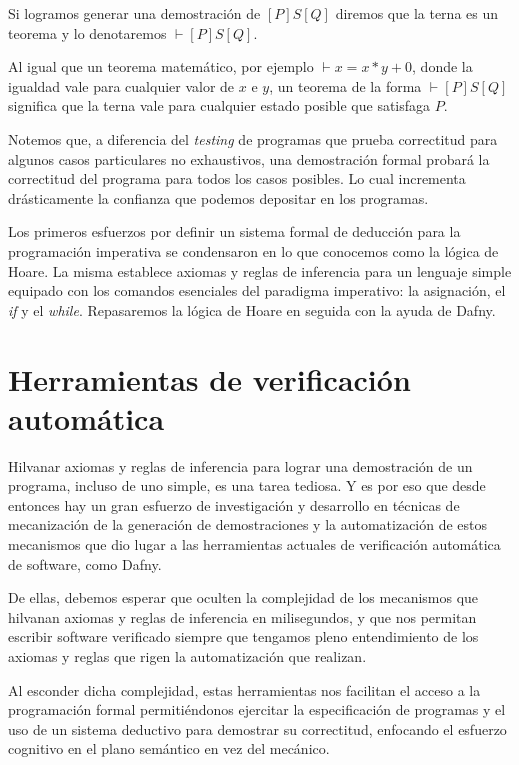 \documentclass[12pt, a4paper, openany, fleqn]{book}
\newcommand{\hoare}[3]{\ensuremath{[#1]#2[#3]}}
\newcommand{\hoareTheorem}[3]{\ensuremath{\vdash[#1]#2[#3]}}
\begin{document}
    Si logramos generar una demostración de \hoare{P}{S}{Q} diremos que la terna es un teorema y lo denotaremos \hoareTheorem{P}{S}{Q}.

    Al igual que un teorema matemático, por ejemplo $\vdash x = x * y + 0$, donde la igualdad vale para cualquier valor de $x$ e $y$, un teorema de la forma \hoareTheorem{P}{S}{Q} significa que la terna vale para cualquier estado posible que satisfaga $P$.

    Notemos que, a diferencia del \textit{testing} de programas que prueba correctitud para algunos casos particulares no exhaustivos, una demostración formal probará la correctitud del programa para todos los casos posibles. Lo cual incrementa drásticamente la confianza que podemos depositar en los programas.

    Los primeros esfuerzos por definir un sistema formal de deducción para la programación imperativa se condensaron en lo que conocemos como la lógica de Hoare.
    La misma establece axiomas y reglas de inferencia para un lenguaje simple equipado con los comandos esenciales del paradigma imperativo: la asignación, el \textit{if} y el \textit{while}. Repasaremos la lógica de Hoare en seguida con la ayuda de Dafny.

    \section{Herramientas de verificación automática}
    Hilvanar axiomas y reglas de inferencia para lograr una demostración de un programa, incluso de uno simple, es una tarea tediosa. Y es por eso que desde entonces hay un gran esfuerzo de investigación y desarrollo en técnicas de mecanización de la generación de demostraciones y la automatización de estos mecanismos que dio lugar a las herramientas actuales de verificación automática de software, como Dafny.

    De ellas, debemos esperar que oculten la complejidad de los mecanismos que hilvanan axiomas y reglas de inferencia en milisegundos, y que nos permitan escribir software verificado siempre que tengamos pleno entendimiento de los axiomas y reglas que rigen la automatización que realizan.

    Al esconder dicha complejidad, estas herramientas nos facilitan el acceso a la programación formal permitiéndonos ejercitar la especificación de programas y el uso de un sistema deductivo para demostrar su correctitud, enfocando el esfuerzo cognitivo en el plano semántico en vez del mecánico.
\end{document}
